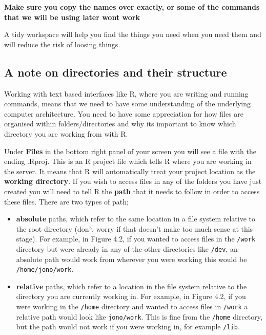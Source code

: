 \documentclass[
]{book}
\providecommand{\tightlist}{%
  \setlength{\itemsep}{0pt}\setlength{\parskip}{0pt}}
\begin{document}
\textbf{Make sure you copy the names over exactly, or some of the commands that we will be using later wont work}

A tidy workspace will help you find the things you need when you need them and will reduce the risk of loosing things.

\subsection{A note on directories and their structure}\label{a-note-on-directories-and-their-structure}

Working with text based interfaces like R, where you are writing and running commands, means that we need to have some understanding of the underlying computer architecture. You need to have some appreciation for how files are organised within folders/directories and why its important to know which directory you are working from with R.

Under \textbf{Files} in the bottom right panel of your screen you will see a file with the ending .Rproj. This is an R project file which tells R where you are working in the server. It means that R will automatically treat your project location as the \textbf{working directory}. If you wish to access files in any of the folders you have just created you will need to tell R the \textbf{path} that it needs to follow in order to access these files. There are two types of path;

\begin{itemize}
\tightlist
\item
  \textbf{absolute} paths, which refer to the same location in a file system relative to the root directory (don't worry if that doesn't make too much sense at this stage). For example, in Figure 4.2, if you wanted to access files in the \texttt{/work} directory but were already in any of the other directories like \texttt{/dev}, an absolute path would work from wherever you were working this would be \texttt{/home/jono/work}.
\item
  \textbf{relative} paths, which refer to a location in the file system relative to the directory you are currently working in. For example, in Figure 4.2, if you were working in the \texttt{/home} directory and wanted to access files in \texttt{/work} a relative path would look like \texttt{jono/work}. This is fine from the \texttt{/home} directory, but the path would not work if you were working in, for example \texttt{/lib}.
\end{itemize}
\end{document}
